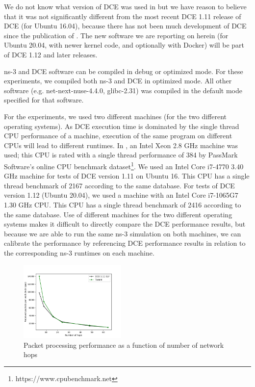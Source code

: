 \documentclass{sig-alternate}
\begin{document}
We do not know what version of DCE was used in \cite{Tazaki13} but we
have reason to believe that it was not significantly different from the
most recent DCE 1.11 release of DCE (for Ubuntu 16.04), because there
has not been much development of DCE since the publication of \cite{Tazaki13}.
The new software we are reporting on herein (for Ubuntu 20.04, with newer
kernel code, and optionally with Docker) will be part of DCE 1.12 and
later releases.

ns-3 and DCE software can be compiled in debug or optimized mode.  For
these experiments, we compiled both ns-3 and DCE in optimized mode.  All
other software (e.g. net-next-nuse-4.4.0, glibc-2.31) was compiled in
the default mode specified for that software.

For the experiments, we used two different machines (for the two different
operating systems).  As DCE execution time is dominated by the single thread
CPU performance of a machine, execution of the same program on different CPUs
will lead to
different runtimes.  In \cite{Tazaki13}, an Intel Xeon 2.8 GHz machine was
used; this CPU is rated with a single thread performance of 384 by PassMark
Software's online CPU benchmark dataset\footnote{https://www.cpubenchmark.net}.
We used an Intel Core i7-4770 3.40 GHz machine for tests of DCE version 1.11
on Ubuntu 16.  This CPU has a single thread benchmark of 2167 according
to the same database.  For tests of DCE version 1.12 (Ubuntu 20.04), we used
a machine with an Intel Core i7-1065G7 1.30 GHz CPU.  This CPU has a
single thread benchmark of 2416 according to the same database.  Use of
different machines for the two different operating systems makes it difficult
to directly compare the DCE performance results, but because we are able to
run the same ns-3 simulation on both machines, we can calibrate the
performance by referencing DCE performance results in relation to the
corresponding ns-3 runtimes on each machine.

\begin{figure}[h!]
  \centering
    \includegraphics[width=0.47\textwidth]{figs/hops-vs-pps.png}
  \caption{Packet processing performance as a function of number of network hops}
  \label{fig:hops-vs-pps}
\end{figure}
\end{document}
